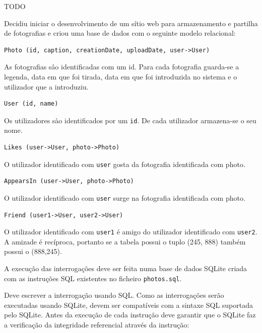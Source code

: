 \documentclass[type=normal, year=2014/15]{bdad_exam}
\begin{document}
{\ansseparator

TODO

Decidiu iniciar o desenvolvimento de um sítio web para armazenamento e partilha de fotografias e criou uma base de dados com o seguinte modelo relacional:

\begin{lstlisting}[numbers=none]
Photo (id, caption, creationDate, uploadDate, user->User)
\end{lstlisting}

As fotografias sâo identificadas com um id. Para cada fotografia guarda-se a legenda, data em que foi tirada, data em que foi introduzida no sistema e o utilizador que a introduziu.

\begin{lstlisting}[numbers=none]
User (id, name)
\end{lstlisting}

Os utilizadores sào identificados por um \texttt{id}. De cada utilizador armazena-se o seu nome.

\begin{lstlisting}[numbers=none]
Likes (user->User, photo->Photo)
\end{lstlisting}

O utilizador identificado com \texttt{user} gosta da fotografia identificada com photo.

\begin{lstlisting}[numbers=none]
AppearsIn (user->User, photo->Photo)
\end{lstlisting}

O utilizador identificado com \texttt{user} surge na fotografia identificada com photo.

\begin{lstlisting}[numbers=none]
Friend (user1->User, user2->User)
\end{lstlisting}

O utilizador identificado com \texttt{user1} é amigo do utilizador identificado com \texttt{user2}. A amizade é recíproca, portanto se a tabela possui o tuplo (245, 888) também possui o (888,245).

A execução das interrogações deve ser feita numa base de dados SQLite criada com as instruções SQL existentes no ficheiro \texttt{photos.sql}.

Deve escrever a interrogação usando SQL. Como as interrogações serão executadas usando SQLite, devem ser compatíveis com a sintaxe SQL suportada pelo SQLite. Antes da execução de cada instrução deve garantir que o SQLite faz a verificação da integridade referencial através da instrução:

}
\end{document}
